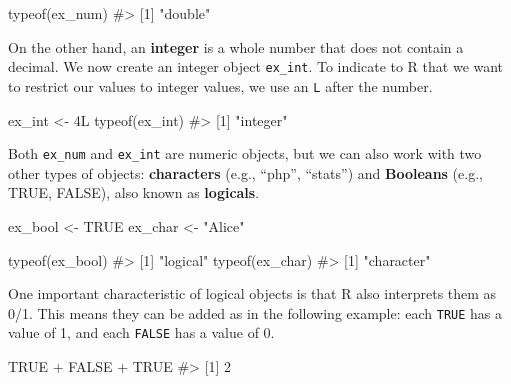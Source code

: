 \documentclass[
  letterpaper,
]{latex/krantz}
\makeatletter
\newenvironment{Shaded}{\begin{snugshade}}{\end{snugshade}}
\newcommand{\CommentTok}[1]{\textcolor[rgb]{0.37,0.37,0.37}{#1}}
\newcommand{\ConstantTok}[1]{\textcolor[rgb]{0.56,0.35,0.01}{#1}}
\newcommand{\DecValTok}[1]{\textcolor[rgb]{0.68,0.00,0.00}{#1}}
\newcommand{\FunctionTok}[1]{\textcolor[rgb]{0.28,0.35,0.67}{#1}}
\newcommand{\NormalTok}[1]{\textcolor[rgb]{0.00,0.23,0.31}{#1}}
\newcommand{\OtherTok}[1]{\textcolor[rgb]{0.00,0.23,0.31}{#1}}
\newcommand{\SpecialCharTok}[1]{\textcolor[rgb]{0.37,0.37,0.37}{#1}}
\newcommand{\StringTok}[1]{\textcolor[rgb]{0.13,0.47,0.30}{#1}}
\newenvironment{kframe}{%
\medskip{}
\setlength{\fboxsep}{.8em}
 \def\at@end@of@kframe{}%
 \ifinner\ifhmode%
  \def\at@end@of@kframe{\end{minipage}}%
  \begin{minipage}{\columnwidth}%
 \fi\fi%
 \def\FrameCommand##1{\hskip\@totalleftmargin \hskip-\fboxsep
 \colorbox{shadecolor}{##1}\hskip-\fboxsep
     \hskip-\linewidth \hskip-\@totalleftmargin \hskip\columnwidth}%
 \MakeFramed {\advance\hsize-\width
   \@totalleftmargin\z@ \linewidth\hsize
   \@setminipage}}%
 {\par\unskip\endMakeFramed%
 \at@end@of@kframe}
\renewenvironment{Shaded}{\begin{kframe}}{\end{kframe}}
\makeatother
\begin{document}
\begin{Shaded}
\begin{Highlighting}[]
\FunctionTok{typeof}\NormalTok{(ex\_num)}
\CommentTok{\#\textgreater{} [1] "double"}
\end{Highlighting}
\end{Shaded}

On the other hand, an \textbf{integer} is a
whole number that does not contain a decimal. We now create an integer
object \texttt{ex\_int}. To indicate to R that we want to restrict our
values to integer values, we use an \texttt{L} after the number.

\begin{Shaded}
\begin{Highlighting}[]
\NormalTok{ex\_int }\OtherTok{\textless{}{-}} \DecValTok{4}\NormalTok{L}
\FunctionTok{typeof}\NormalTok{(ex\_int)}
\CommentTok{\#\textgreater{} [1] "integer"}
\end{Highlighting}
\end{Shaded}

Both \texttt{ex\_num} and \texttt{ex\_int} are numeric objects, but we
can also work with two other types of objects:
\textbf{characters} (e.g., ``php'',
``stats'') and \textbf{Booleans} (e.g., TRUE,
FALSE), also known as \textbf{logicals}.

\begin{Shaded}
\begin{Highlighting}[]
\NormalTok{ex\_bool }\OtherTok{\textless{}{-}} \ConstantTok{TRUE}
\NormalTok{ex\_char }\OtherTok{\textless{}{-}} \StringTok{"Alice"}

\FunctionTok{typeof}\NormalTok{(ex\_bool)}
\CommentTok{\#\textgreater{} [1] "logical"}
\FunctionTok{typeof}\NormalTok{(ex\_char)}
\CommentTok{\#\textgreater{} [1] "character"}
\end{Highlighting}
\end{Shaded}

One important characteristic of logical objects is that R also
interprets them as 0/1. This means they can be added as in the following
example: each \texttt{TRUE} has a value of 1, and each \texttt{FALSE}
has a value of 0.

\begin{Shaded}
\begin{Highlighting}[]
\ConstantTok{TRUE} \SpecialCharTok{+} \ConstantTok{FALSE} \SpecialCharTok{+} \ConstantTok{TRUE}
\CommentTok{\#\textgreater{} [1] 2}
\end{Highlighting}
\end{Shaded}
\end{document}
